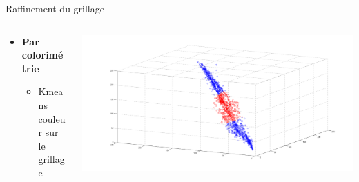 \begin{frame}{Raffinement du grillage}

	\begin{columns}
		\begin{column}{5cm}
		\begin{itemize}
			\item\textbf{Par colorimétrie}
			\begin{itemize}
				\item Kmeans couleur sur le grillage
			\end{itemize}
		\end{itemize}
		\end{column}

		\begin{column}{5cm}
			\includegraphics[width = 1 \columnwidth]{fig/Kmeans.png}
		\end{column}
	\end{columns}
	

\end{frame}
